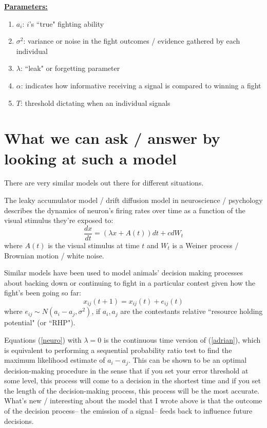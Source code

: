 \documentclass{article}
\begin{document}
\underline{\bf Parameters:}
\begin{enumerate}
\item{$a_i$: $i$'s ``true" fighting ability}
\item{$\sigma^2$: variance or noise in the fight outcomes / evidence gathered by each individual}
\item{$\lambda$: ``leak" or forgetting parameter}
\item{$\alpha$: indicates how informative receiving a signal is compared to winning a fight}
\item{$T$: threshold dictating when an individual signals}
\end{enumerate}

\section{What we can ask / answer by looking at such a model}
There are very similar models out there for different situations.  

The leaky accumulator model / drift diffusion model in neuroscience / psychology describes the dynamics of neuron's firing rates over time as a function of the visual stimulus they're exposed to:
\begin{equation} \frac{dx}{dt}=(\lambda x+A(t))dt+cdW_t \label{neuro} \end{equation}
where $A(t)$ is the visual stimulus at time $t$ and $W_t$ is a Weiner process / Brownian motion / white noise.


Similar models have been used to model animals' decision making processes about backing down or continuing to fight in a particular contest given how the fight's been going so far:
\begin{equation} x_{ij}(t+1)=x_{ij}(t)+e_{ij}(t) \label{adrian} \end{equation}
where $e_{ij}\sim N(a_i-a_j,\sigma^2)$, if $a_i,a_j$ are the contestants relative ``resource holding potential" (or ``RHP").  


Equations (\ref{neuro}) with $\lambda=0$ is the continuous time version of (\ref{adrian}), which is equivalent to performing a sequential probability ratio test to find the maximum likelihood estimate of $a_i-a_j$.  This can be shown to be an optimal decision-making procedure in the sense that if you set your error threshold at some level, this process will come to a decision in the shortest time and if you set the length of the decision-making process, this process will be the most accurate.  What's new / interesting about the model that I wrote above is that the outcome of the decision process-- the emission of a signal-- feeds back to influence future decisions.  
\end{document}
